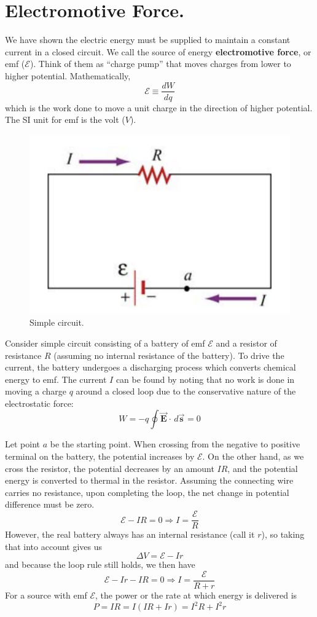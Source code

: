 \documentclass[11pt, letterpaper]{article}
\newcommand{\bv}[2][]{\bm{\vec{#2}_{#1}}}
\begin{document}
\section{Electromotive Force.}
We have shown the electric energy must be supplied to maintain a constant current in a closed circuit. We call the source of energy \textbf{electromotive force}, or emf ($\mathcal{E}$). Think of them as ``charge pump'' that moves charges from lower to higher potential. Mathematically, \[\mathcal{E}\equiv\frac{dW}{dq}\] which is the work done to move a unit charge in the direction of higher potential. The SI unit for emf is the volt ($V$). 
\begin{figure}[h!]
	\centering
	\includegraphics[scale=0.6]{simple}
	\caption{Simple circuit.}
	\label{fig:simple}
\end{figure}

Consider simple circuit consisting of a battery of emf $\mathcal{E}$ and a resistor of resistance $R$ (assuming no internal resistance of the battery). To drive the current, the battery undergoes a discharging process which converts chemical energy to emf. The current $I$ can be found by noting that no work is done in moving a charge $q$ around a closed loop due to the conservative nature of the electrostatic force: \[W = -q\oint\bv{E}\cdot\, d\bv{s} = 0\]

Let point $a$ be the starting point. When crossing from the negative to positive terminal on the battery, the potential increases by $\mathcal{E}$. On the other hand, as we cross the resistor, the potential decreases by an amount $IR$, and the potential energy is converted to thermal in the resistor. Assuming the connecting wire carries no resistance, upon completing the loop, the net change in potential difference must be zero. \[\mathcal{E} - IR = 0 \Rightarrow I = \frac{\mathcal{E}}{R}\] However, the real battery always has an internal resistance (call it $r$), so taking that into account gives us \[\Delta V = \mathcal{E} - Ir\] and because the loop rule still holds, we then have \[\mathcal{E} - Ir - IR = 0\Rightarrow I = \frac{\mathcal{E}}{R + r}\] For a source with emf $\mathcal{E}$, the power or the rate at which energy is delivered is \[P = IR = I(IR + Ir) = I^2R + I^2r\]
\end{document}
